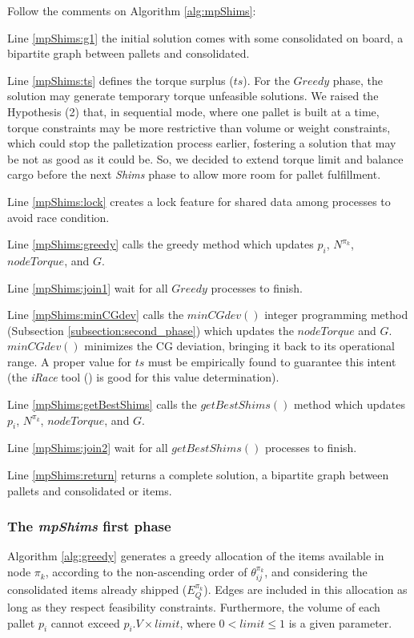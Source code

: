 \documentclass[preprint,authoryear]{elsarticle}
\begin{document}
Follow the comments on Algorithm \ref{alg:mpShims}:

Line \ref{mpShims:g1} the initial solution comes with some consolidated on board, a bipartite graph between pallets and consolidated.

Line \ref{mpShims:ts} defines the torque surplus ($ts$). For the $Greedy$ phase, the solution may generate temporary torque unfeasible solutions. We raised the Hypothesis (2) that, in sequential mode, where one pallet is built at a time, torque constraints may be more restrictive than volume or weight constraints, which could stop the palletization process earlier, fostering a solution that may be not as good as it could be. So, we decided to extend torque limit and balance cargo before the next {\it Shims} phase to allow more room for pallet fulfillment.

Line \ref{mpShims:lock} creates a lock feature for shared data among processes to avoid race condition.

Line \ref{mpShims:greedy} calls the greedy method which updates $p_i$, $N^{\pi_k}$, $nodeTorque$, and $G$.

Line \ref{mpShims:join1} wait for all $Greedy$ processes to finish.

Line \ref{mpShims:minCGdev} calls the $minCGdev()$ integer programming method (Subsection \ref{subsection:second_phase}) which updates the $nodeTorque$ and $G$. $minCGdev()$ minimizes the CG deviation, bringing it back to its operational range. A proper value for $ts$ must be empirically found to guarantee this intent (the {\it iRace} tool (\cite{LopezIbanezManuel2016}) is good for this value determination).

Line \ref{mpShims:getBestShims} calls the $getBestShims()$ method which updates $p_i$, $N^{\pi_k}$, $nodeTorque$, and $G$.

Line \ref{mpShims:join2} wait for all $getBestShims()$ processes to finish.

Line \ref{mpShims:return} returns a complete solution, a bipartite graph between pallets and consolidated or items.


\subsubsection{The {\it mpShims} first phase}


Algorithm \ref{alg:greedy} generates a greedy allocation of the items available in node ${\pi_k}$, according to the non-ascending order of $\theta^{\pi_k}_{ij}$, and considering the consolidated items already shipped ($E_Q^{\pi_k}$). Edges are included in this allocation as long as they respect feasibility constraints. Furthermore, the volume of each pallet $p_i$\/ cannot exceed $p_i.V \times limit$, where $ 0 < limit \leq 1$\/ is a given parameter.
\end{document}
